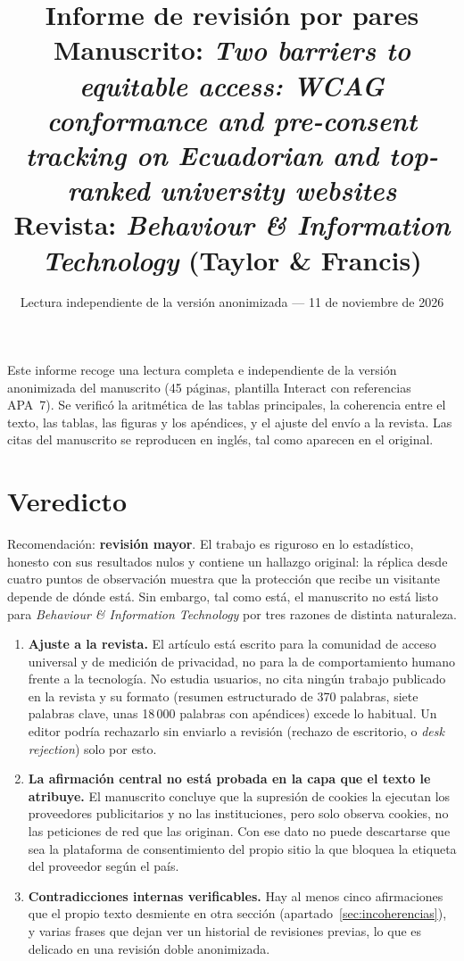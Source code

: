 \documentclass[11pt,a4paper]{article}
\title{\textbf{Informe de revisi\'on por pares}\\[4pt]
	\large Manuscrito: \emph{Two barriers to equitable access: WCAG conformance and pre-consent tracking on Ecuadorian and top-ranked university websites}\\[4pt]
	\normalsize Revista: \emph{Behaviour \& Information Technology} (Taylor \& Francis)}
\author{}
\date{Lectura independiente de la versi\'on anonimizada --- 11 de noviembre de 2026}
\begin{document}
\maketitle
\thispagestyle{fancy}

\noindent Este informe recoge una lectura completa e independiente de la versi\'on anonimizada del manuscrito (45 p\'aginas, plantilla Interact con referencias APA~7). Se verific\'o la aritm\'etica de las tablas principales, la coherencia entre el texto, las tablas, las figuras y los ap\'endices, y el ajuste del env\'io a la revista. Las citas del manuscrito se reproducen en ingl\'es, tal como aparecen en el original.

\section{Veredicto}

Recomendaci\'on: \textbf{revisi\'on mayor}. El trabajo es riguroso en lo estad\'istico, honesto con sus resultados nulos y contiene un hallazgo original: la r\'eplica desde cuatro puntos de observaci\'on muestra que la protecci\'on que recibe un visitante depende de d\'onde est\'a. Sin embargo, tal como est\'a, el manuscrito no est\'a listo para \emph{Behaviour \& Information Technology} por tres razones de distinta naturaleza.

\begin{enumerate}
	\item \textbf{Ajuste a la revista.} El art\'iculo est\'a escrito para la comunidad de acceso universal y de medici\'on de privacidad, no para la de comportamiento humano frente a la tecnolog\'ia. No estudia usuarios, no cita ning\'un trabajo publicado en la revista y su formato (resumen estructurado de 370 palabras, siete palabras clave, unas 18\,000 palabras con ap\'endices) excede lo habitual. Un editor podr\'ia rechazarlo sin enviarlo a revisi\'on (rechazo de escritorio, o \emph{desk rejection}) solo por esto.
	\item \textbf{La afirmaci\'on central no est\'a probada en la capa que el texto le atribuye.} El manuscrito concluye que la supresi\'on de cookies la ejecutan los proveedores publicitarios y no las instituciones, pero solo observa cookies, no las peticiones de red que las originan. Con ese dato no puede descartarse que sea la plataforma de consentimiento del propio sitio la que bloquea la etiqueta del proveedor seg\'un el pa\'is.
	\item \textbf{Contradicciones internas verificables.} Hay al menos cinco afirmaciones que el propio texto desmiente en otra secci\'on (apartado~\ref{sec:incoherencias}), y varias frases que dejan ver un historial de revisiones previas, lo que es delicado en una revisi\'on doble anonimizada.
\end{enumerate}
\end{document}
